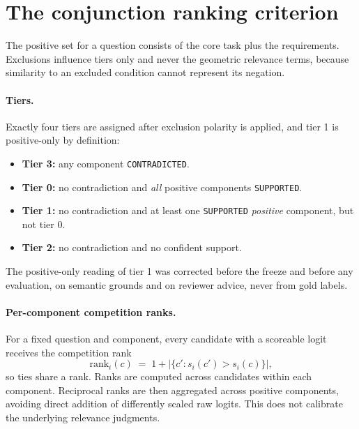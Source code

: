 \documentclass[11pt,a4paper]{article}
\begin{document}
\section{The conjunction ranking criterion}
\label{sec:criterion}

The positive set for a question consists of the core task plus the requirements. Exclusions influence tiers only and never the geometric relevance terms, because similarity to an excluded condition cannot represent its negation.

\paragraph{Tiers.} Exactly four tiers are assigned after exclusion polarity is applied, and tier 1 is positive-only by definition:
\begin{itemize}
\item \textbf{Tier 3:} any component \texttt{CONTRADICTED}.
\item \textbf{Tier 0:} no contradiction and \emph{all} positive components \texttt{SUPPORTED}.
\item \textbf{Tier 1:} no contradiction and at least one \texttt{SUPPORTED} \emph{positive} component, but not tier 0.
\item \textbf{Tier 2:} no contradiction and no confident support.
\end{itemize}
The positive-only reading of tier 1 was corrected before the freeze and before any evaluation, on semantic grounds and on reviewer advice, never from gold labels.

\paragraph{Per-component competition ranks.} For a fixed question and component, every candidate with a scoreable logit receives the competition rank
\begin{equation}
\mathrm{rank}_i(c) \;=\; 1 + \left| \{ c' : s_i(c') > s_i(c) \} \right| ,
\end{equation}
so ties share a rank. Ranks are computed across candidates within each component. Reciprocal ranks are then aggregated across positive components, avoiding direct addition of differently scaled raw logits. This does not calibrate the underlying relevance judgments.
\end{document}

